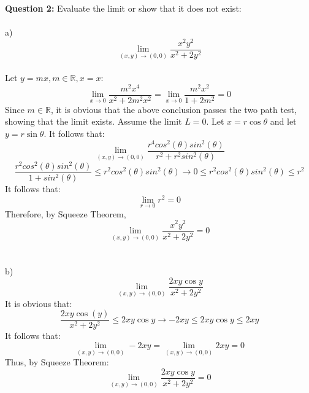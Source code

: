 \documentclass{article}
\begin{document}
\textbf{Question 2:} Evaluate the limit or show that it does not exist: \\
\\
\tab a) \[\lim_{(x,y)\to(0,0)} \frac{x^2y^2}{x^2+2y^2} \]
\\
Let $y=mx, m \in \mathbb{R}, x=x:$
\[\lim_{x\to 0} \frac{m^2x^4}{x^2+2m^2x^2} = \lim_{x\to 0} \frac{m^2x^2}{1+2m^2} = 0 \]
Since $m \in \mathbb{R}$, it is obvious that the above conclusion passes the two path test, showing that the limit exists. Assume the limit $L = 0$. Let $x=r\cos{\theta}$ and let $y=r\sin{\theta}$. It follows that:
\[ \lim_{(x,y) \to (0,0)} \frac{r^4cos^2(\theta)sin^2(\theta)}{r^2+r^2sin^2(\theta)} \]
\[ \frac{r^2cos^2(\theta)sin^2(\theta)}{1+sin^2(\theta)} \leq r^2cos^2(\theta)sin^2(\theta) \rightarrow 0 \leq r^2cos^2(\theta)sin^2(\theta) \leq r^2 \]
It follows that:
\[ \lim_{r \to 0} r^2 = 0 \]
Therefore, by Squeeze Theorem,
\[ \lim_{(x,y)\to(0,0)} \frac{x^2y^2}{x^2+2y^2} = 0 \]
\\
\\


\tab b) \[\lim_{(x,y)\to(0,0)} \frac{2xy\cos{y}}{x^2+2y^2} \]
It is obvious that:
\[ \frac{2xy\cos(y)}{x^2+2y^2} \leq 2xy\cos{y} \rightarrow -2xy \leq 2xy\cos{y} \leq 2xy \]
It follows that: 
\[ \lim_{(x,y) \to (0,0)} -2xy = \lim_{(x,y) \to (0,0)} 2xy = 0 \]
Thus, by Squeeze Theorem:
\[\lim_{(x,y)\to(0,0)} \frac{2xy\cos{y}}{x^2+2y^2}  = 0\]
\end{document}
